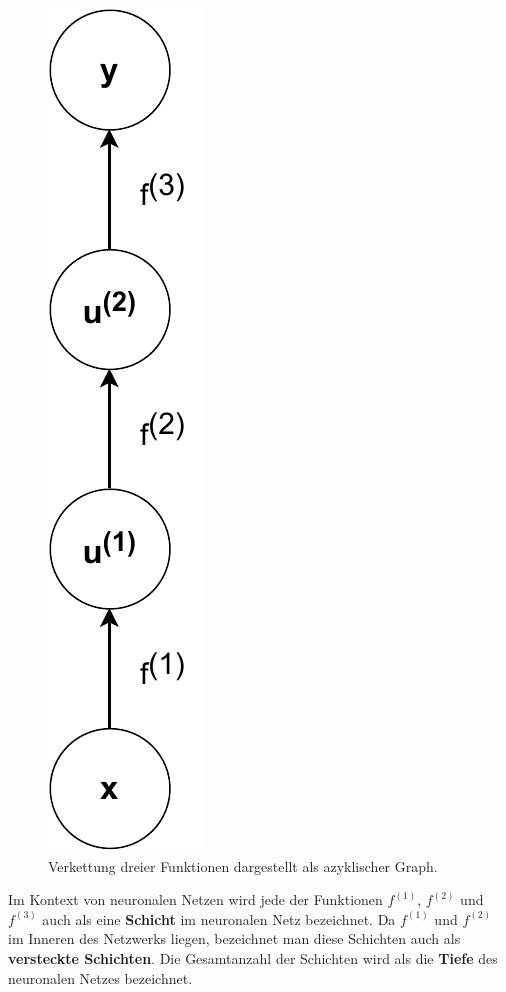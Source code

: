 \begin{figure}[h]
    \centering
    \includegraphics[height=0.3\textheight]{abbildungen/basic_network_graph}
    \caption{Verkettung dreier Funktionen dargestellt als azyklischer Graph.}
    \label{fig:einfacher-graph}
\end{figure}

Im Kontext von neuronalen Netzen wird jede der Funktionen
$f^{(1)}$, $f^{(2)}$ und $f^{(3)}$ auch als eine \textbf{Schicht} im
neuronalen Netz bezeichnet.
Da $f^{(1)}$ und $f^{(2)}$ im Inneren des Netzwerks liegen, bezeichnet man
diese Schichten auch als \textbf{versteckte Schichten}.
Die Gesamtanzahl der Schichten wird als die \textbf{Tiefe} des neuronalen
Netzes bezeichnet.

